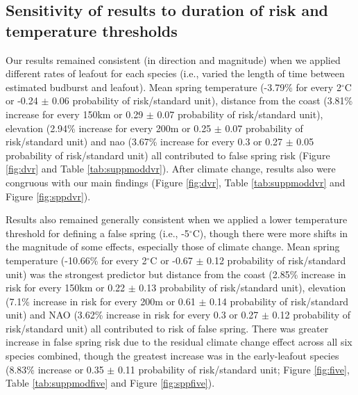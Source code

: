 \documentclass{article}\usepackage[]{graphicx}\usepackage[]{color}
\begin{document}
\subsection*{Sensitivity of results to duration of risk and temperature thresholds}
Our results remained consistent (in direction and magnitude) when we applied different rates of leafout for each species (i.e., varied the length of time between estimated budburst and leafout). Mean spring temperature (-3.79\% for every 2$^\circ$C or -0.24 $\pm$ 0.06 probability of risk/standard unit), distance from the coast (3.81\% increase for every 150km or 0.29 $\pm$ 0.07 probability of risk/standard unit), elevation (2.94\% increase for every 200m or 0.25 $\pm$ 0.07 probability of risk/standard unit) and nao (3.67\% increase for every 0.3 or 0.27 $\pm$ 0.05 probability of risk/standard unit) all contributed to false spring risk (Figure \ref{fig:dvr} and Table \ref{tab:suppmoddvr}). After climate change, results also were congruous with our main findings (Figure \ref{fig:dvr}, Table \ref{tab:suppmoddvr} and Figure \ref{fig:sppdvr}).  

Results also remained generally consistent when we applied a lower temperature threshold for defining a false spring (i.e., -5$^{\circ}$C), though there were more shifts in the magnitude of some effects, especially those of climate change. Mean spring temperature (-10.66\% for every 2$^\circ$C or -0.67 $\pm$ 0.12 probability of risk/standard unit) was the strongest predictor but distance from the coast (2.85\% increase in risk for every 150km or 0.22 $\pm$ 0.13 probability of risk/standard unit), elevation (7.1\% increase in risk for every 200m or 0.61 $\pm$ 0.14 probability of risk/standard unit) and NAO (3.62\% increase in risk for every 0.3 or 0.27 $\pm$ 0.12 probability of risk/standard unit) all contributed to risk of false spring. There was greater increase in false spring risk due to the residual climate change effect across all six species combined, though the greatest increase was in the early-leafout species (8.83\% increase or 0.35 $\pm$ 0.11 probability of risk/standard unit; Figure \ref{fig:five}, Table \ref{tab:suppmodfive} and Figure \ref{fig:sppfive}). 
\end{document}
